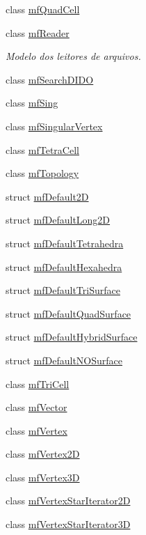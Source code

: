 \begin{DoxyCompactItemize}
class \hyperlink{classmf_1_1mfQuadCell}{mfQuadCell}
\item 
class \hyperlink{classmf_1_1mfReader}{mfReader}
\begin{DoxyCompactList}\small\item\em Modelo dos leitores de arquivos. \item\end{DoxyCompactList}\item 
class \hyperlink{classmf_1_1mfSearchDIDO}{mfSearchDIDO}
\item 
class \hyperlink{classmf_1_1mfSing}{mfSing}
\item 
class \hyperlink{classmf_1_1mfSingularVertex}{mfSingularVertex}
\item 
class \hyperlink{classmf_1_1mfTetraCell}{mfTetraCell}
\item 
class \hyperlink{classmf_1_1mfTopology}{mfTopology}
\item 
struct \hyperlink{structmf_1_1mfDefault2D}{mfDefault2D}
\item 
struct \hyperlink{structmf_1_1mfDefaultLong2D}{mfDefaultLong2D}
\item 
struct \hyperlink{structmf_1_1mfDefaultTetrahedra}{mfDefaultTetrahedra}
\item 
struct \hyperlink{structmf_1_1mfDefaultHexahedra}{mfDefaultHexahedra}
\item 
struct \hyperlink{structmf_1_1mfDefaultTriSurface}{mfDefaultTriSurface}
\item 
struct \hyperlink{structmf_1_1mfDefaultQuadSurface}{mfDefaultQuadSurface}
\item 
struct \hyperlink{structmf_1_1mfDefaultHybridSurface}{mfDefaultHybridSurface}
\item 
struct \hyperlink{structmf_1_1mfDefaultNOSurface}{mfDefaultNOSurface}
\item 
class \hyperlink{classmf_1_1mfTriCell}{mfTriCell}
\item 
class \hyperlink{classmf_1_1mfVector}{mfVector}
\item 
class \hyperlink{classmf_1_1mfVertex}{mfVertex}
\item 
class \hyperlink{classmf_1_1mfVertex2D}{mfVertex2D}
\item 
class \hyperlink{classmf_1_1mfVertex3D}{mfVertex3D}
\item 
class \hyperlink{classmf_1_1mfVertexStarIterator2D}{mfVertexStarIterator2D}
\item 
class \hyperlink{classmf_1_1mfVertexStarIterator3D}{mfVertexStarIterator3D}
\item 

\end{DoxyCompactItemize}

